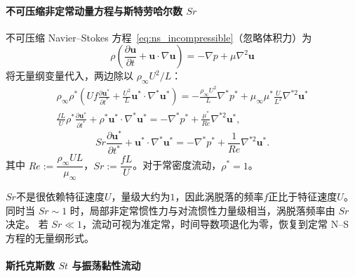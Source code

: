 \paragraph{不可压缩非定常动量方程与斯特劳哈尔数 $Sr$ }
不可压缩 Navier--Stokes 方程~\eqref{eq:ns_incompressible}（忽略体积力）为
\begin{equation}
    \rho \left( \frac{\partial \mathbf{u}}{\partial t} + \mathbf{u}\cdot\nabla\mathbf{u} \right) = -\nabla p + \mu \nabla^2 \mathbf{u}
\end{equation}
将无量纲变量代入，两边除以 $\rho_\infty U^2/L$：
\begin{gather*}
    \rho_\infty \rho^* \left(U f \frac{\partial \mathbf{u}^*}{\partial t^*}+ \frac{U^2}{L} \mathbf{u}^*\cdot\nabla^*\mathbf{u}^*
\right)=-\frac{\rho_\infty U^2}{L} \nabla^* p^*+ \mu_\infty \mu^* \frac{U}{L^2} \nabla^{*2} \mathbf{u}^*
\\
    \frac{fL}{U} \rho^* \frac{\partial \mathbf{u}^*}{\partial t^*} + \rho^* \mathbf{u}^*\cdot\nabla^*\mathbf{u}^* = -\nabla^* p^* + \frac{\mu^*}{Re} \nabla^{*2}\mathbf{u}^*,
\end{gather*}
\begin{equation}
    Sr \frac{\partial \mathbf{u}^*}{\partial t^*} + \mathbf{u}^*\cdot\nabla^*\mathbf{u}^* = -\nabla^* p^* + \frac{1}{Re} \nabla^{*2}\mathbf{u}^*.
    \label{eq:ns_nondim_Sr}
\end{equation}
其中 $Re := \dfrac{\rho_\infty U L}{\mu_\infty}$，\(Sr := \dfrac{fL}{U}\)。对于常密度流动，$\rho^* = 1$。

$Sr$不是很依赖特征速度\(U\)，量级大约为\(1\)，因此涡脱落的频率\(f\)正比于特征速度\(U\)。
同时当 $Sr \sim 1$ 时，局部非定常惯性力与对流惯性力量级相当，涡脱落频率由 $Sr$ 决定。
若 $Sr \ll 1$，流动可视为准定常，时间导数项退化为零，恢复到定常 N--S 方程的无量纲形式。

\paragraph{斯托克斯数 $St$ 与振荡黏性流动}

